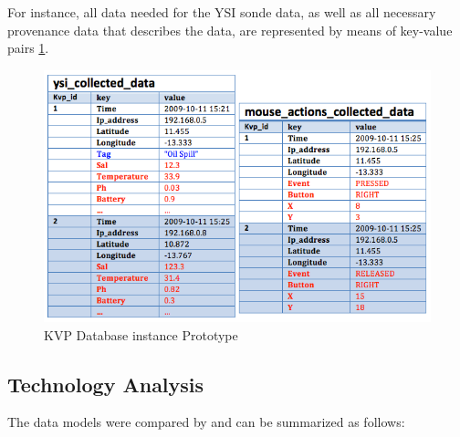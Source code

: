 For instance, all data needed for the YSI sonde data, as well as all necessary
provenance data that describes the data, are represented by means of key-value
pairs \ref{fig:persistence-example-kvp}.

\begin{figure}[!h]
  \centering
  \includegraphics[scale=0.5]{../diagrams/persistence-example-kvp}
  \caption{KVP Database instance Prototype}
  \label{fig:persistence-example-kvp}
\end{figure}

\subsection{Technology Analysis}

The data models were compared by \cite{db-is-rdbs-dommed} and can be summarized
as follows:

